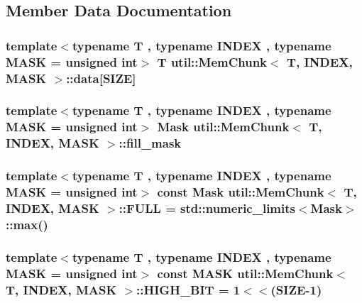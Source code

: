 \subsection{Member Data Documentation}
\hypertarget{structutil_1_1MemChunk_a0ff1b0148d66615bcd280b61eb96fcb0}{
\subsubsection[{data}]{\setlength{\rightskip}{0pt plus 5cm}template$<$typename T , typename I\-N\-D\-E\-X , typename M\-A\-S\-K  = unsigned int$>$ T {\bf util\-::\-Mem\-Chunk}$<$ T, I\-N\-D\-E\-X, M\-A\-S\-K $>$\-::data\mbox{[}{\bf S\-I\-Z\-E}\mbox{]}}}\label{structutil_1_1MemChunk_a0ff1b0148d66615bcd280b61eb96fcb0}
\hypertarget{structutil_1_1MemChunk_a78a7b9297f9bf281eef4c29b1d2b48f6}{
\subsubsection[{fill\-\_\-mask}]{\setlength{\rightskip}{0pt plus 5cm}template$<$typename T , typename I\-N\-D\-E\-X , typename M\-A\-S\-K  = unsigned int$>$ {\bf Mask} {\bf util\-::\-Mem\-Chunk}$<$ T, I\-N\-D\-E\-X, M\-A\-S\-K $>$\-::fill\-\_\-mask}}\label{structutil_1_1MemChunk_a78a7b9297f9bf281eef4c29b1d2b48f6}
\hypertarget{structutil_1_1MemChunk_a7d4625b286d5ade5d6b07d7f2db1065f}{
\subsubsection[{F\-U\-L\-L}]{\setlength{\rightskip}{0pt plus 5cm}template$<$typename T , typename I\-N\-D\-E\-X , typename M\-A\-S\-K  = unsigned int$>$ const {\bf Mask} {\bf util\-::\-Mem\-Chunk}$<$ T, I\-N\-D\-E\-X, M\-A\-S\-K $>$\-::F\-U\-L\-L = std\-::numeric\-\_\-limits$<${\bf Mask}$>$\-::max()\hspace{0.3cm}{\ttfamily [static]}}}\label{structutil_1_1MemChunk_a7d4625b286d5ade5d6b07d7f2db1065f}
\hypertarget{structutil_1_1MemChunk_a17e94adf5f378b536687c8782dee4f71}{
\subsubsection[{H\-I\-G\-H\-\_\-\-B\-I\-T}]{\setlength{\rightskip}{0pt plus 5cm}template$<$typename T , typename I\-N\-D\-E\-X , typename M\-A\-S\-K  = unsigned int$>$ const M\-A\-S\-K {\bf util\-::\-Mem\-Chunk}$<$ T, I\-N\-D\-E\-X, M\-A\-S\-K $>$\-::H\-I\-G\-H\-\_\-\-B\-I\-T = 1$<$$<$({\bf S\-I\-Z\-E}-\/1)\hspace{0.3cm}{\ttfamily [static]}}}\label{structutil_1_1MemChunk_a17e94adf5f378b536687c8782dee4f71}
